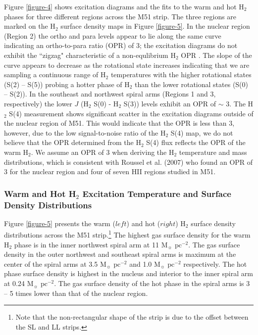 \documentclass[12pt,preprint]{aastex}
\begin{document}
Figure \ref{figure-4} shows excitation diagrams and the 
fits to the warm and hot H$_2$ phases for three
different regions across the M51 strip.  The three 
regions are marked on the H$_2$ surface density 
maps in Figure \ref{figure-5}.  In the nuclear region 
(Region 2) the ortho and para levels appear to lie along the 
same curve indicating an ortho-to-para ratio (OPR) of 3; 
the excitation diagrams do not exhibit the ``zigzag" characteristic of a 
non-equlibrium H$_2$ OPR \citep{neu98, fue99}.  The 
slope of the curve appears to decrease as the rotational 
state increases indicating that we are sampling a continuous 
range of H$_2$ temperatures with the higher rotational 
states (S(2) -- S(5)) probing a hotter phase of H$_2$ 
than the lower rotational states (S(0) -- S(2)).  In the 
southeast and northwest spiral arms (Regions 1 and 
3, respectively) the lower $J$ (H$_2$ S(0) - 
H$_2$ S(3)) levels exhibit an OPR of $\sim$ 3.  The 
H$_2$ S(4) measurement shows significant 
scatter in the excitation diagrams outside of the nuclear 
region of M51.  This would indicate that the OPR is 
less than 3, however, due to the low signal-to-noise 
ratio of the H$_2$ S(4) map, we do not 
believe that the OPR determined from the H$_2$ 
S(4) flux reflects the OPR of the warm H$_2$. 
We assume an OPR of 3 when deriving the H$_2$ 
temperature and mass distributions, which is consistent 
with Roussel et al. (2007) who found an OPR of 3  for the 
nuclear region and four of seven HII regions studied in M51.

\subsubsection{Warm and Hot H$_2$ Excitation Temperature and Surface Density Distributions}

Figure \ref{figure-5} presents the warm ($left$) and hot ($right$)
H$_2$ surface density distributions across the M51 
strip.\footnote{Note that the non-rectangular shape of the strip 
is due to the offset between the SL and LL strips.}  The highest 
gas surface density for the warm H$_2$ phase is in 
the inner northwest spiral arm at 11 $\mathrm{M_\sun}$ 
$\mathrm{pc^{-2}}$. The gas surface density in the outer 
northwest and southeast spiral arms is maximum at the 
center of the spiral arms at 3.5 $\mathrm{M_\sun}$ 
$\mathrm{pc^{-2}}$ and 1.0 $\mathrm{M_\sun}$ $\mathrm{pc^{-2}}$ 
respectively.  The hot phase surface density is highest in 
the nucleus and interior to the inner spiral arm at 0.24 
$\mathrm{M_\sun}$ $\mathrm{pc^{-2}}$.  The gas surface 
density of the hot phase in the spiral arms is 3 -- 5 times 
lower than that of the nuclear region.
\end{document}
